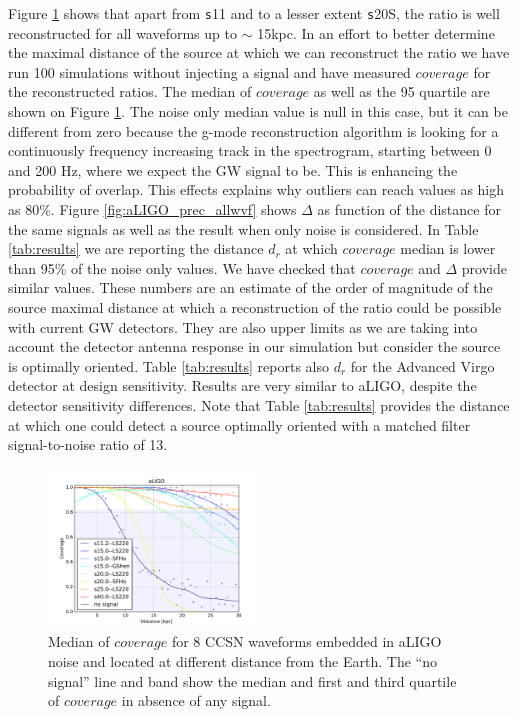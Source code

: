 Figure \ref{fig:aLIGO_cov_allwvf} shows that apart from {\texttt s11} and to a lesser extent
{\texttt s20S}, the ratio is well reconstructed for all waveforms up to $\sim$ 15kpc. In an
effort to better determine the maximal distance of the source at which we can reconstruct the ratio
we have run 100 simulations without injecting a signal and have measured $coverage$ for the
reconstructed ratios.
The median of $coverage$ as well as the 95 quartile are shown on Figure \ref{fig:aLIGO_cov_allwvf}.
The noise only median value is null in this case, but it can be different from zero because
the g-mode reconstruction algorithm is looking for a continuously frequency increasing track
in the spectrogram, starting between 0 and 200 Hz, where we expect the GW signal to be.
This is enhancing the probability of overlap. This effects explains why outliers can reach
values as high as 80\%.
Figure \ref{fig:aLIGO_prec_allwvf} shows $\Delta$ as function of the distance for the same signals
as well as the result when only noise is considered. 
In Table \ref{tab:results} we are reporting the distance $d_r$ at which $coverage$ median is lower
than 95\% of the noise only values. We have checked that $coverage$ and $\Delta$ provide similar
values.
These numbers are an estimate of the order of magnitude of the source maximal distance at which a
reconstruction of the ratio could be possible with current GW detectors.
They are also upper limits as we are taking into account the detector antenna response in our
simulation but consider the source is optimally oriented. 
Table \ref{tab:results} reports also $d_r$ for the Advanced Virgo detector at design sensitivity.
Results are very similar to aLIGO, despite the detector sensitivity differences.
Note that Table \ref{tab:results} provides the distance at which one could detect a source
optimally oriented with a matched filter signal-to-noise ratio of 13.

\begin{figure}
  \centering
  \includegraphics[width=0.5\textwidth]{plots/aLIGO_coverage_allwvfs}
 \caption{Median of $coverage$ for 8 CCSN waveforms embedded in aLIGO noise and located at different distance from the Earth. The ``no signal'' line and band show the median and first and third quartile of $coverage$ in absence of any signal.} \label{fig:aLIGO_cov_allwvf}
\end{figure}

